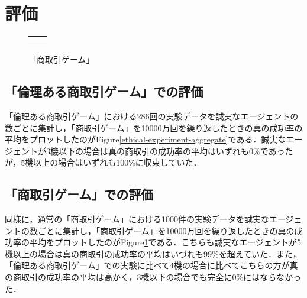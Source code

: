 \section{評価}

\begin{figure}[h]
  \begin{tabular}{cc}
    \begin{minipage}[t]{1\hsize}
      \centering
      \caption{「倫理ある商取引ゲーム」}
      \label{ethical-experiment-aggregate}
    \end{minipage} \\
    \begin{minipage}[t]{1\hsize}
      \centering
      \caption{「商取引ゲーム」}
      \label{non-ethical-experiment-aggregate}
    \end{minipage}
  \end{tabular}
\end{figure}

\subsection{「倫理ある商取引ゲーム」での評価}
「倫理ある商取引ゲーム」における286回の実験データを誠実なエージェントの数ごとに集計し，「商取引ゲーム」を10000万回を繰り返したときの真の成功率の平均をプロットしたのがFigure\ref{ethical-experiment-aggregate}である．誠実なエージェントが3機以下の場合は真の商取引の成功率の平均はいずれも0\%であったが，5機以上の場合はいずれも100\%に収束していた．

\subsection{「商取引ゲーム」での評価}
同様に，通常の「商取引ゲーム」における1000件の実験データを誠実なエージェントの数ごとに集計し，「商取引ゲーム」を10000万回を繰り返したときの真の成功率の平均をプロットしたのがFigure\ref{non-ethical-experiment-aggregate}である．こちらも誠実なエージェントが5機以上の場合は真の商取引の成功率の平均はいづれも99\%を超えていた．また，「倫理ある商取引ゲーム」での実験に比べて4機の場合に比べてこちらの方が真の商取引の成功率の平均は高かく，3機以下の場合でも完全に0\%にはならなかった．
